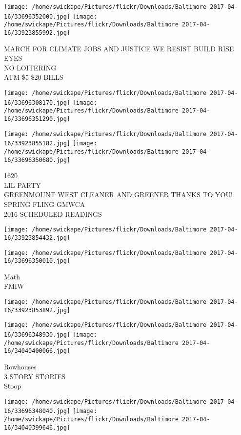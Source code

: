 \documentclass[10pt,letterpaper]{article}
\begin{document}
\texttt{[image: /home/swickape/Pictures/flickr/Downloads/Baltimore 2017-04-16/33696352000.jpg]}
\texttt{[image: /home/swickape/Pictures/flickr/Downloads/Baltimore 2017-04-16/33923855992.jpg]}

MARCH FOR CLIMATE JOBS AND JUSTICE WE RESIST BUILD RISE\\
EYES\\
NO LOITERING\\
ATM \$5 \$20 BILLS
\pagebreak

\texttt{[image: /home/swickape/Pictures/flickr/Downloads/Baltimore 2017-04-16/33696308170.jpg]}
\texttt{[image: /home/swickape/Pictures/flickr/Downloads/Baltimore 2017-04-16/33696351290.jpg]}

\texttt{[image: /home/swickape/Pictures/flickr/Downloads/Baltimore 2017-04-16/33923855182.jpg]}
\texttt{[image: /home/swickape/Pictures/flickr/Downloads/Baltimore 2017-04-16/33696350680.jpg]}

1620\\
LIL PARTY\\
GREENMOUNT WEST CLEANER AND GREENER THANKS TO YOU!  SPRING FLING GMWCA\\
2016 SCHEDULED READINGS
\pagebreak

\texttt{[image: /home/swickape/Pictures/flickr/Downloads/Baltimore 2017-04-16/33923854432.jpg]}

\vspace{0.25in}
\texttt{[image: /home/swickape/Pictures/flickr/Downloads/Baltimore 2017-04-16/33696350010.jpg]}

Math\\
FMIW
\pagebreak

\texttt{[image: /home/swickape/Pictures/flickr/Downloads/Baltimore 2017-04-16/33923853892.jpg]}

\vspace{0.25in}
\texttt{[image: /home/swickape/Pictures/flickr/Downloads/Baltimore 2017-04-16/33696348930.jpg]}
\texttt{[image: /home/swickape/Pictures/flickr/Downloads/Baltimore 2017-04-16/34040400066.jpg]}

Rowhouses\\
3 STORY STORIES\\
Stoop
\pagebreak

\texttt{[image: /home/swickape/Pictures/flickr/Downloads/Baltimore 2017-04-16/33696348040.jpg]}
\texttt{[image: /home/swickape/Pictures/flickr/Downloads/Baltimore 2017-04-16/34040399646.jpg]}
\end{document}
